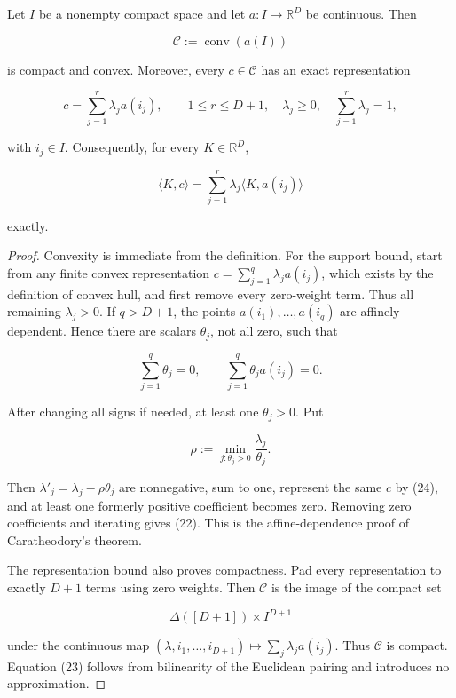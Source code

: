 \begin{lemma}\label{lem:step-004-finite-barycenter}
Let \(I\) be a nonempty compact space and let \(a:I\to\mathbb R^D\) be
continuous. Then

\[
\mathcal C:=\operatorname{conv}(a(I))
\]

is compact and convex. Moreover, every \(c\in\mathcal C\) has an exact
representation

\[
c=\sum_{j=1}^r\lambda_j a(i_j),
\qquad
1\le r\le D+1,
\quad
\lambda_j\ge0,
\quad
\sum_{j=1}^r\lambda_j=1,
\tag{22}
\]

with \(i_j\in I\). Consequently, for every \(K\in\mathbb R^D\),

\[
\langle K,c\rangle
=\sum_{j=1}^r\lambda_j\langle K,a(i_j)\rangle
\tag{23}
\]

exactly.
\end{lemma}

\begin{proof}
Convexity is immediate from the definition. For the support bound, start
from any finite convex representation
\(c=\sum_{j=1}^q\lambda_ja(i_j)\), which exists by the definition of convex
hull, and first remove every zero-weight term. Thus all remaining
\(\lambda_j>0\). If \(q>D+1\), the points
\(a(i_1),\ldots,a(i_q)\) are affinely dependent. Hence there are scalars
\(\theta_j\), not all zero, such that

\[
\sum_{j=1}^q\theta_j=0,
\qquad
\sum_{j=1}^q\theta_ja(i_j)=0.
\tag{24}
\]

After changing all signs if needed, at least one \(\theta_j>0\). Put

\[
\rho:=\min_{j:\theta_j>0}\frac{\lambda_j}{\theta_j}.
\]

Then \(\lambda'_j=\lambda_j-\rho\theta_j\) are nonnegative, sum to one,
represent the same \(c\) by (24), and at least one formerly positive
coefficient becomes zero. Removing zero coefficients and iterating gives
(22). This is the affine-dependence proof of Caratheodory's theorem.

The representation bound also proves compactness. Pad every representation
to exactly \(D+1\) terms using zero weights. Then \(\mathcal C\) is the
image of the compact set

\[
\Delta([D+1])\times I^{D+1}
\]

under the continuous map
\((\lambda,i_1,\ldots,i_{D+1})\mapsto
\sum_j\lambda_ja(i_j)\). Thus \(\mathcal C\) is compact. Equation (23)
follows from bilinearity of the Euclidean pairing and introduces no
approximation. \end{proof}


